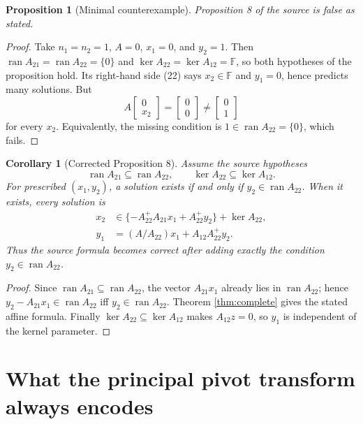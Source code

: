 \documentclass[11pt]{article}
\newtheorem{corollary}[theorem]{Corollary}
\newtheorem{proposition}[theorem]{Proposition}
\newcommand{\F}{\mathbb F}
\newcommand{\ran}{\operatorname{ran}}
\begin{document}
\begin{proposition}[Minimal counterexample]\label{prop:counterexample}
Proposition 8 of the source is false as stated.
\end{proposition}

\begin{proof}
Take $n_1=n_2=1$, $A=0$, $x_1=0$, and $y_2=1$.  Then
$\ran A_{21}=\ran A_{22}=\{0\}$ and
$\ker A_{22}=\ker A_{12}=\F$, so both hypotheses of the proposition hold.
Its right-hand side (22) says $x_2\in\F$ and $y_1=0$, hence predicts many
solutions.  But
\[
 A\begin{bmatrix}0\\x_2\end{bmatrix}
 =\begin{bmatrix}0\\0\end{bmatrix}
 \ne\begin{bmatrix}0\\1\end{bmatrix}
\]
for every $x_2$.  Equivalently, the missing condition is
$1\in\ran A_{22}=\{0\}$, which fails.
\end{proof}

\begin{corollary}[Corrected Proposition 8]\label{cor:repair}
Assume the source hypotheses
\[
 \ran A_{21}\subseteq\ran A_{22},
 \qquad \ker A_{22}\subseteq\ker A_{12}.
\]
For prescribed $(x_1,y_2)$, a solution exists if and only if
$y_2\in\ran A_{22}$.  When it exists, every solution is
\begin{align*}
 x_2&\in\{-A_{22}^{+}A_{21}x_1+A_{22}^{+}y_2\}
       +\ker A_{22},\\
 y_1&=(A/A_{22})x_1+A_{12}A_{22}^{+}y_2.
\end{align*}
Thus the source formula becomes correct after adding exactly the condition
$y_2\in\ran A_{22}$.
\end{corollary}

\begin{proof}
Since $\ran A_{21}\subseteq\ran A_{22}$, the vector $A_{21}x_1$ already
lies in $\ran A_{22}$; hence
$y_2-A_{21}x_1\in\ran A_{22}$ iff $y_2\in\ran A_{22}$.  Theorem
\ref{thm:complete} gives the stated affine formula.  Finally
$\ker A_{22}\subseteq\ker A_{12}$ makes $A_{12}z=0$, so $y_1$ is
independent of the kernel parameter.
\end{proof}

\section{What the principal pivot transform always encodes}
\end{document}
